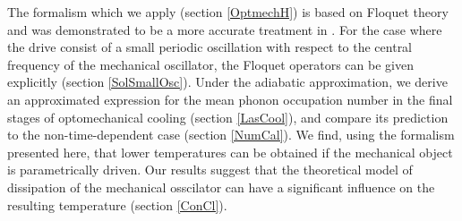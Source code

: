 \documentclass[reprint, amsmath,amssymb, aps,pra]{revtex4-1}
\begin{document}
The formalism which we apply (section \ref{OptmechH}) is based on
Floquet theory and was demonstrated to be a more accurate treatment in
\cite{HanngiFM}. For the case where the drive consist of a small
periodic oscillation with respect to the central frequency of the
mechanical oscillator, the Floquet operators can be given explicitly
(section \ref{SolSmallOsc}). Under the adiabatic approximation, we
derive an approximated expression for the mean phonon occupation
number in the final stages of optomechanical cooling (section
\ref{LasCool}), and compare its prediction to the non-time-dependent
case (section \ref{NumCal}). We find, using the formalism presented
here, that lower temperatures can be obtained if the mechanical object
is parametrically driven. Our results suggest that the theoretical
model of dissipation of the mechanical osscilator can have a
significant influence on the resulting temperature (section
\ref{ConCl}).




\end{document}
